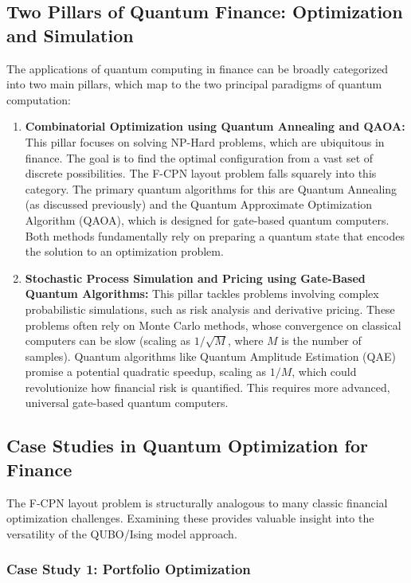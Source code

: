 \documentclass[11pt,a4paper]{article}
\begin{document}
\subsection{Two Pillars of Quantum Finance: Optimization and Simulation}

The applications of quantum computing in finance can be broadly categorized into two main pillars, which map to the two principal paradigms of quantum computation:

\begin{enumerate}
    \item \textbf{Combinatorial Optimization using Quantum Annealing and QAOA:} This pillar focuses on solving NP-Hard problems, which are ubiquitous in finance. The goal is to find the optimal configuration from a vast set of discrete possibilities. The F-CPN layout problem falls squarely into this category. The primary quantum algorithms for this are Quantum Annealing (as discussed previously) and the Quantum Approximate Optimization Algorithm (QAOA), which is designed for gate-based quantum computers. Both methods fundamentally rely on preparing a quantum state that encodes the solution to an optimization problem.
    \item \textbf{Stochastic Process Simulation and Pricing using Gate-Based Quantum Algorithms:} This pillar tackles problems involving complex probabilistic simulations, such as risk analysis and derivative pricing. These problems often rely on Monte Carlo methods, whose convergence on classical computers can be slow (scaling as $1/\sqrt{M}$, where $M$ is the number of samples). Quantum algorithms like Quantum Amplitude Estimation (QAE) promise a potential quadratic speedup, scaling as $1/M$, which could revolutionize how financial risk is quantified. This requires more advanced, universal gate-based quantum computers.
\end{enumerate}

\subsection{Case Studies in Quantum Optimization for Finance}

The F-CPN layout problem is structurally analogous to many classic financial optimization challenges. Examining these provides valuable insight into the versatility of the QUBO/Ising model approach.

\subsubsection{Case Study 1: Portfolio Optimization}
\end{document}
